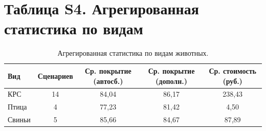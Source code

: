 \documentclass[11pt]{article}
\begin{document}
\section*{Таблица S4. Агрегированная статистика по видам}
\begin{table}[H]
\centering
\caption{Агрегированная статистика по видам животных.}\label{tab:s4_sp}
\begin{tabular}{lcccc}
\toprule
\textbf{Вид} & \textbf{Сценариев} & \textbf{Ср. покрытие (автосб.)} & \textbf{Ср. покрытие (дополн.)} & \textbf{Ср. стоимость (руб.)} \\
\midrule
КРС & 14 & 84{,}04 & 86{,}17 & 238{,}43 \\
Птица & 4 & 77{,}23 & 81{,}42 & 4{,}50 \\
Свиньи & 5 & 85{,}66 & 84{,}67 & 87{,}89 \\
\bottomrule
\end{tabular}
\end{table}
\end{document}
